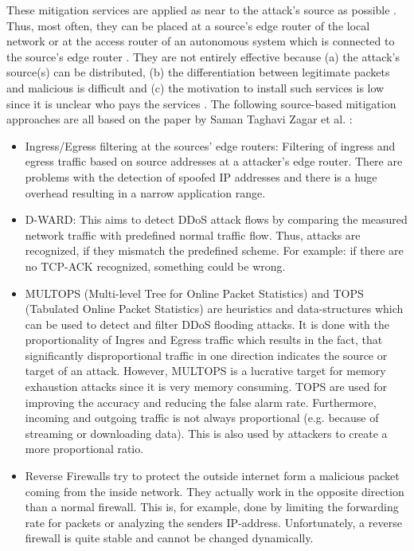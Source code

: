 These mitigation services are applied as near to the attack's source as possible \cite{DDoS-MitigationSurvey}. Thus, most often, they can be placed at a source's edge router of the local network or at the access router of an autonomous system which is connected to the source's edge router \cite{DDoS-MitigationSurvey}. They are not entirely effective because (a) the attack's source(s) can be distributed, (b) the differentiation between legitimate packets and malicious is difficult and (c) the motivation to install such services is low since it is unclear who pays the services \cite{DDoS-MitigationSurvey}. The following source-based mitigation approaches are all based on the paper by Saman Taghavi Zagar et al. \cite{DDoS-MitigationSurvey}:
    \begin{itemize}
        \item Ingress/Egress filtering at the sources' edge routers: Filtering of ingress and egress traffic based on source addresses at a attacker's edge router. There are problems with the detection of spoofed IP addresses and there is a huge overhead resulting in a narrow application range. 
        \item D-WARD: This aims to detect DDoS attack flows by comparing the measured network traffic with predefined normal traffic flow. Thus, attacks are recognized, if they mismatch the predefined scheme. For example: if there are no TCP-ACK recognized, something could be wrong.
        \item MULTOPS (Multi-level Tree for Online Packet Statistics) and TOPS (Tabulated Online Packet Statistics) are heuristics and data-structures which can be used to detect and filter DDoS flooding attacks. It is done with the proportionality of Ingres and Egress traffic which results in the fact, that significantly disproportional traffic in one direction indicates the source or target of an attack. However, MULTOPS is a lucrative target for memory exhaustion attacks since it is very memory consuming. TOPS are used for improving the accuracy and reducing the false alarm rate. Furthermore, incoming and outgoing traffic is not always proportional (e.g. because of streaming or downloading data). This is also used by attackers to create a more proportional ratio. 
        \item Reverse Firewalls try to protect the outside internet form a malicious packet coming from the inside network. They actually work in the opposite direction than a normal firewall. This is, for example, done by limiting the forwarding rate for packets or analyzing the senders IP-address. Unfortunately, a reverse firewall is quite stable and cannot be changed dynamically.
    \end{itemize}
    
